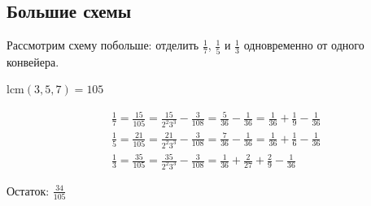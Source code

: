 \subsection{Большие схемы}

\noindent Рассмотрим схему побольше: отделить $\frac17$, $\frac15$ и $\frac13$ одновременно от одного конвейера.

$\text{lcm}(3, 5, 7) = 105$

\begin{align*}
	&\frac{1}{7} = \frac{15}{105} = \frac{15}{2^2 3^3} - \frac{3}{108} = \frac{5}{36} - \frac{1}{36} = \frac{1}{36} + \frac{1}{9} - \frac{1}{36} \\
	&\frac{1}{5} = \frac{21}{105} = \frac{21}{2^2 3^3} - \frac{3}{108} = \frac{7}{36} - \frac{1}{36} = \frac{1}{36} + \frac{1}{6} - \frac{1}{36} \\
	&\frac{1}{3} = \frac{35}{105} = \frac{35}{2^2 3^3} - \frac{3}{108} = \frac{1}{36} + \frac{2}{27} + \frac{2}{9} - \frac{1}{36}
\end{align*}

Остаток: $\frac{34}{105}$






\vspace{0.5in}



